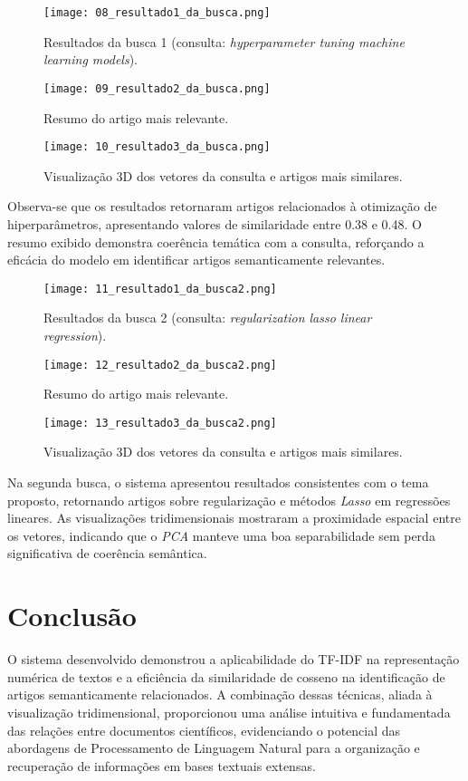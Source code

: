 \documentclass[12pt,a4paper]{article}
\begin{document}
\begin{figure}[H]
    \centering
    \texttt{[image: 08\_resultado1\_da\_busca.png]}
    \caption{Resultados da busca 1 (consulta: \textit{hyperparameter tuning machine learning models}).}
\end{figure}

\begin{figure}[H]
    \centering
    \texttt{[image: 09\_resultado2\_da\_busca.png]}
    \caption{Resumo do artigo mais relevante.}
\end{figure}

\begin{figure}[H]
    \centering
    \texttt{[image: 10\_resultado3\_da\_busca.png]}
    \caption{Visualização 3D dos vetores da consulta e artigos mais similares.}
\end{figure}

Observa-se que os resultados retornaram artigos relacionados à otimização de hiperparâmetros, apresentando valores de similaridade entre 0.38 e 0.48. O resumo exibido demonstra coerência temática com a consulta, reforçando a eficácia do modelo em identificar artigos semanticamente relevantes.

\begin{figure}[H]
    \centering
    \texttt{[image: 11\_resultado1\_da\_busca2.png]}
    \caption{Resultados da busca 2 (consulta: \textit{regularization lasso linear regression}).}
\end{figure}

\begin{figure}[H]
    \centering
    \texttt{[image: 12\_resultado2\_da\_busca2.png]}
    \caption{Resumo do artigo mais relevante.}
\end{figure}

\begin{figure}[H]
    \centering
    \texttt{[image: 13\_resultado3\_da\_busca2.png]}
    \caption{Visualização 3D dos vetores da consulta e artigos mais similares.}
\end{figure}

Na segunda busca, o sistema apresentou resultados consistentes com o tema proposto, retornando artigos sobre regularização e métodos \textit{Lasso} em regressões lineares. As visualizações tridimensionais mostraram a proximidade espacial entre os vetores, indicando que o \textit{PCA} manteve uma boa separabilidade sem perda significativa de coerência semântica.

\section*{Conclusão}
O sistema desenvolvido demonstrou a aplicabilidade do TF-IDF na representação numérica de textos e a eficiência da similaridade de cosseno na identificação de artigos semanticamente relacionados.  
A combinação dessas técnicas, aliada à visualização tridimensional, proporcionou uma análise intuitiva e fundamentada das relações entre documentos científicos, evidenciando o potencial das abordagens de Processamento de Linguagem Natural para a organização e recuperação de informações em bases textuais extensas.
\end{document}
